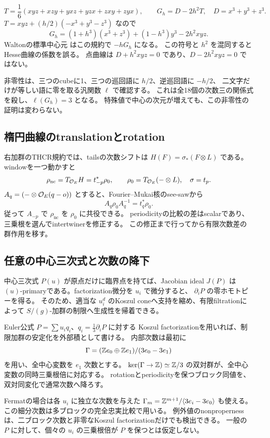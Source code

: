 \[
 T=\frac16(xyz+xzy+yxz+yzx+zxy+zyx),\qquad G_h=D-2h^2T,
 \quad D=x^3+y^3+z^3.
\]
\(T=xyz+(h/2)(-x^3+y^3-z^3)\) なので
\[
 G_h=(1+h^3)(x^3+z^3)+(1-h^3)y^3-2h^2xyz.
\]
Waltonの標準中心元 \cite[Equation (2.16)]{Walton} はこの規約で \(-hG_h\) になる。
この符号と \(h^2\) を混同するとHesse曲線の係数を誤る。
点曲線は \(D+h^2xyz=0\) であり、\(D-2h^2xyz=0\) ではない。

非零性は、三つのcubeに1、三つの巡回語に \(h/2\)、逆巡回語に \(-h/2\)、
二文字だけが等しい語に零を取る汎関数 \(\ell\) で確認する。
これは全18個の次数三の関係式を殺し、\(\ell(G_h)=3\) となる。
特殊値で中心の次元が増えても、この非零性の証明は変わらない。

\subsection{楕円曲線のtranslationとrotation}

右加群のTHCR規約では、tailsの次数シフトは
\(H(F)=\sigma_*(F\otimes L)\) である。
windowを一つ動かすと
\[
 \rho_{\mathrm{nc}}=T_{\mathcal O_E}H=t_{-p}^*\rho_0,
 \qquad \rho_0=T_{\mathcal O_E}(-\otimes L),\quad\sigma=t_p.
\]
\(A_q=(-\otimes\mathcal O_E(q-o))\) とすると、Fourier--Mukai核のsee-sawから
\[
 A_q\rho_0A_q^{-1}=t_q^*\rho_0.
\]
従って \(A_{-p}\) で \(\rho_{\mathrm{nc}}\) を \(\rho_0\) に共役できる。
periodicityの比較の差はscalarであり、三乗根を選んでintertwinerを修正する。
この修正まで行ってから有限次数差の群作用を移す。

\subsection{任意の中心三次式と次数の降下}

中心三次式 \(P(u)\) が原点だけに臨界点を持てば、Jacobian ideal \(J(P)\) は
\((u)\)-primaryである。factorization微分を \(u_i\) で微分すると、
\(\partial_iP\) の零ホモトピーを得る。
そのため、適当な \(u_i^d\) のKoszul coneへ支持を縮め、有限filtrationによって
\(S/(g)\)-加群の制限へ生成性を帰着できる。

Euler公式 \(P=\sum u_iq_i\)、\(q_i=\frac13\partial_iP\) に対する
Koszul factorizationを用いれば、制限加群の安定化を外部積として書ける。
内部次数は最初に
\[
 \Gamma=(\mathbb Z e_0\oplus\mathbb Z e_1)/(3e_0-3e_1)
\]
を用い、全中心変数を \(e_1\) 次数とする。
\(\ker(\Gamma\to\mathbb Z)\simeq\mathbb Z/3\) の双対群が、全中心変数の同時三乗根倍に対応する。
rotationとperiodicityを保つブロック同値を、双対同変化で通常次数へ降ろす。

Fermatの場合は各 \(u_i\) に独立な次数を与えた
\(\Gamma_m=\mathbb Z^{m+1}/\langle3e_i-3e_0\rangle\) も使える。
この細分次数は多ブロックの完全忠実比較で用いる。
例外値のnonpropernessは、二ブロック次数と非零なKoszul factorizationだけでも検出できる。
一般の \(P\) に対して、個々の \(u_i\) の三乗根倍が \(P\) を保つとは仮定しない。

